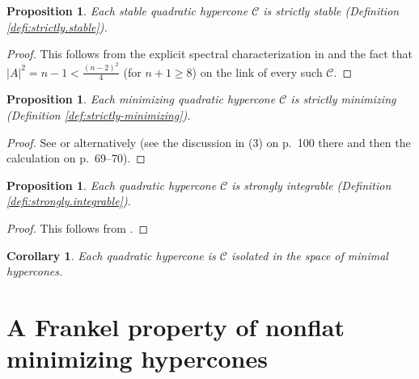 \documentclass[11pt, letterpaper, reqno]{amsart}
\numberwithin{equation}{section}
\newtheorem{Prop}[Def]{Proposition}
\newtheorem{Cor}[Def]{Corollary}
\theoremstyle{remark}
\newcommand{\cC}{\mathcal{C}}
\begin{document}
\begin{Prop} \label{prop:quadratic.strictly.stable}
	Each stable quadratic hypercone $\cC$ is strictly stable (Definition \ref{defi:strictly.stable}).
\end{Prop}
\begin{proof}
	This follows from the explicit spectral characterization in \cite[Theorem 4.5]{CaffarelliHardtSimon} and the fact that $|A|^2 = n-1 < \tfrac{(n-2)^2}{4}$ (for $n+1 \geq 8$) on the link of every such $\cC$.
\end{proof}

\begin{Prop} \label{prop:quadratic.strictly.minimizing}
	Each minimizing quadratic hypercone $\cC$ is strictly minimizing (Definition \ref{def:strictly-minimizing}).
\end{Prop}
\begin{proof}
See \cite{Lin:strict-min} or alternatively \cite{Lawlor:sufficient} (see the discussion in (3) on p.\ 100 there and then the calculation on p.\ 69--70).
\end{proof}

\begin{Prop} \label{prop:quadratic.integrable}
	Each quadratic hypercone $\cC$ is strongly integrable (Definition \ref{defi:strongly.integrable}).
\end{Prop}
\begin{proof}
	This follows from \cite[Proposition 2.7]{SimonSolomon:quadratic}.
\end{proof}

\begin{Cor} \label{coro:quadratic.isolated}
	Each quadratic hypercone is $\cC$ isolated in the space of minimal hypercones.
\end{Cor}


\section{A Frankel property of nonflat minimizing hypercones}
\end{document}

